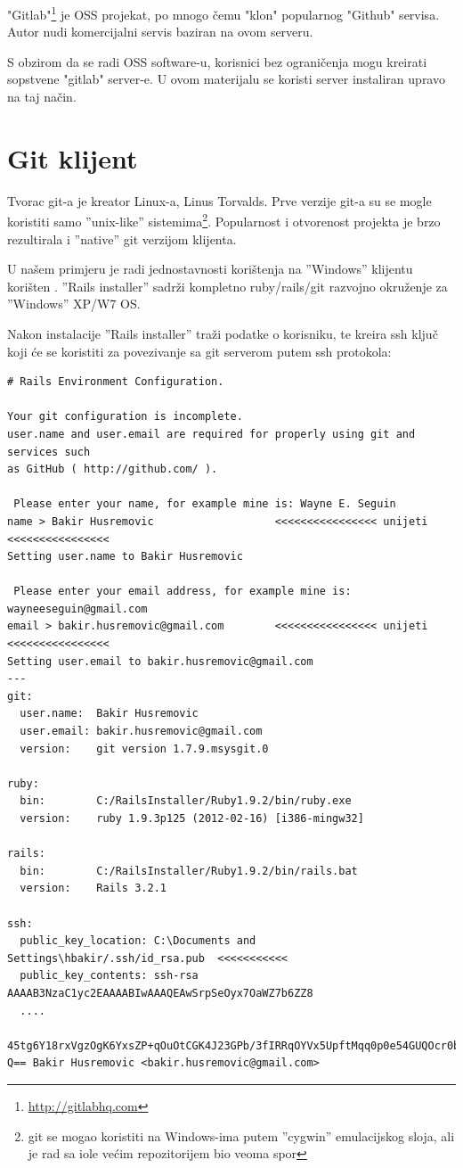 \documentclass[times, utf8, seminar]{fit}
\begin{document}
"Gitlab"\footnote{\url{http://gitlabhq.com}} je OSS projekat, po mnogo čemu "klon" popularnog "Github" servisa. 
Autor nudi komercijalni servis \href{https://gitlab.com}{\color{blue}{''gitlab.com''}} baziran na ovom serveru.

S obzirom da se radi OSS software-u, korisnici bez ograničenja mogu kreirati sopstvene "gitlab" server-e.
U ovom materijalu se koristi server \href{https://gitlab.knowhow.out.ba}{\color{blue}{''gitlab.knowhow.out.ba''}} instaliran upravo na taj način.

\section{Git klijent}

Tvorac git-a je kreator Linux-a, Linus Torvalds. Prve verzije git-a su se mogle koristiti samo ''unix-like'' sistemima\footnote{git se mogao koristiti na Windows-ima putem ''cygwin'' emulacijskog sloja, ali je rad sa iole većim repozitorijem bio veoma spor}. 
Popularnost i otvorenost projekta je brzo rezultirala i ''native'' git verzijom klijenta.

U našem primjeru je radi jednostavnosti korištenja na ''Windows'' klijentu korišten \href{http://railsinstaller.org/}{\color{blue}{''Rails installer''}}. 
''Rails installer'' sadrži kompletno ruby/rails/git razvojno okruženje za ''Windows'' XP/W7 OS.

Nakon instalacije ''Rails installer'' traži podatke o korisniku, te kreira ssh ključ koji će se koristiti za povezivanje sa git serverom putem ssh protokola:

\begin{lstlisting}
# Rails Environment Configuration.

Your git configuration is incomplete.
user.name and user.email are required for properly using git and services such
as GitHub ( http://github.com/ ).

 Please enter your name, for example mine is: Wayne E. Seguin
name > Bakir Husremovic                   <<<<<<<<<<<<<<<< unijeti <<<<<<<<<<<<<<<<
Setting user.name to Bakir Husremovic

 Please enter your email address, for example mine is: wayneeseguin@gmail.com
email > bakir.husremovic@gmail.com        <<<<<<<<<<<<<<<< unijeti <<<<<<<<<<<<<<<<
Setting user.email to bakir.husremovic@gmail.com
---
git:
  user.name:  Bakir Husremovic
  user.email: bakir.husremovic@gmail.com
  version:    git version 1.7.9.msysgit.0

ruby:
  bin:        C:/RailsInstaller/Ruby1.9.2/bin/ruby.exe
  version:    ruby 1.9.3p125 (2012-02-16) [i386-mingw32]

rails:
  bin:        C:/RailsInstaller/Ruby1.9.2/bin/rails.bat
  version:    Rails 3.2.1

ssh:
  public_key_location: C:\Documents and Settings\hbakir/.ssh/id_rsa.pub  <<<<<<<<<<<
  public_key_contents: ssh-rsa AAAAB3NzaC1yc2EAAAABIwAAAQEAwSrpSeOyx7OaWZ7b6ZZ8
  ....
  45tg6Y18rxVgzOgK6YxsZP+qOuOtCGK4J23GPb/3fIRRqOYVx5UpftMqq0p0e54GUQOcr0bS+/ooYNC
Q== Bakir Husremovic <bakir.husremovic@gmail.com>
\end{lstlisting}
\end{document}
